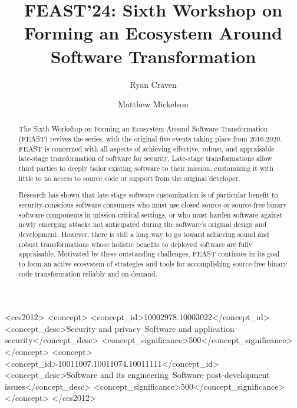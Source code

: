 \documentclass[sigconf]{acmart}
\begin{document}
\title[FEAST'24]{FEAST'24: Sixth Workshop on Forming an Ecosystem Around Software Transformation}

\author{Ryan Craven}

\author{Matthew Mickelson}

\renewcommand{\shortauthors}{Ryan Craven and Matthew Mickelson}

\begin{abstract}
The Sixth Workshop on Forming an Ecosystem Around Software Transformation (FEAST)
revives the series, with the original five events taking place from 2016-2020.
FEAST is concerned with all aspects of achieving effective, robust, and appraisable late-stage
transformation of software for security. Late-stage transformations allow
third parties to deeply tailor existing software to their mission,
customizing it with little to no access to source code or support from the original developer.

Research has shown that late-stage software customization is of particular benefit to security-conscious
software consumers who must use closed-source or source-free binary software components in mission-critical settings,
or who must harden software against newly emerging attacks not anticipated during the software's original design and development.
However, there is still a long way to go toward achieving sound and robust transformations whose
holistic benefits to deployed software are fully appraisable.
Motivated by these outstanding challenges, FEAST continues in its goal to form an active ecosystem of strategies and tools
for accomplishing source-free binary code transformation reliably and on-demand.
\end{abstract}

\begin{CCSXML}
  <ccs2012>
  <concept>
  <concept_id>10002978.10003022</concept_id>
  <concept_desc>Security and privacy~Software and application security</concept_desc>
  <concept_significance>500</concept_significance>
  </concept>
  <concept>
  <concept_id>10011007.10011074.10011111</concept_id>
  <concept_desc>Software and its engineering~Software post-development issues</concept_desc>
  <concept_significance>500</concept_significance>
  </concept>
  </ccs2012>
\end{CCSXML}
  
\end{document}
